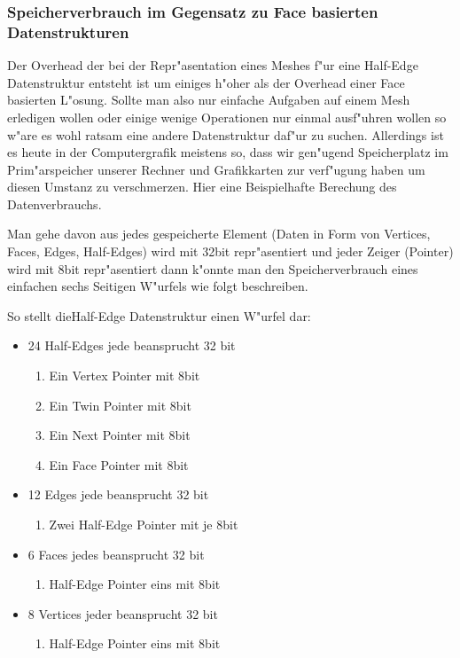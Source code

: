 \documentclass[pagesize, paper=a4, fontsize=12pt,titlepage=true, headings=small, headnosepline, abstractoff, liststotoc, nochapterprefix, plainheadsepline]{scrreprt}
\newcommand{\HES}{Half-Edge Datenstruktur }
\begin{document}
\subsubsection {Speicherverbrauch im Gegensatz zu Face basierten Datenstrukturen}
			Der Overhead der bei der Repr"asentation eines Meshes f"ur eine \HES entsteht ist um einiges h"oher als der Overhead einer Face basierten L"osung. Sollte man also nur einfache Aufgaben auf einem Mesh erledigen wollen oder einige wenige Operationen nur einmal ausf"uhren wollen so w"are es wohl ratsam eine andere Datenstruktur daf"ur zu suchen. Allerdings ist es heute in der Computergrafik meistens so, dass wir gen"ugend Speicherplatz im Prim"arspeicher unserer Rechner und Grafikkarten zur verf"ugung haben um diesen Umstanz zu verschmerzen.
Hier eine Beispielhafte Berechung des Datenverbrauchs.

Man gehe davon aus jedes gespeicherte Element (Daten in Form von Vertices, Faces, Edges, Half-Edges) wird mit 32bit repr"asentiert und jeder Zeiger (Pointer) wird mit 8bit repr"asentiert dann k"onnte man den Speicherverbrauch eines einfachen sechs Seitigen W"urfels wie folgt beschreiben.

So stellt die\HES einen W"urfel dar:
\begin{itemize}
\item 24 Half-Edges jede beansprucht 32 bit
	\begin{enumerate}
    	\item Ein Vertex Pointer mit 8bit
    	\item Ein Twin Pointer mit 8bit
    	\item Ein Next Pointer mit 8bit
    	\item Ein Face Pointer mit 8bit
	\end{enumerate}
\item 12 Edges jede beansprucht 32 bit
	\begin{enumerate}
    	\item Zwei Half-Edge Pointer mit je 8bit
	\end{enumerate}
\item 6 Faces jedes beansprucht 32 bit
	\begin{enumerate}
    	\item Half-Edge Pointer eins mit 8bit
	\end{enumerate}
\item 8 Vertices jeder beansprucht 32 bit
	\begin{enumerate}
    	\item Half-Edge Pointer eins mit 8bit
	\end{enumerate}
\end{itemize}
\end{document}
